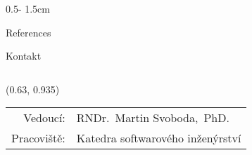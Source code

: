 \documentclass[a0paper]{uioposter}
\begin{document}
\begin{frame}
\begin{columns}[onlytextwidth]
\begin{column}{0.5\textwidth - 1.5cm}
    \begin{block}{References}
        \lipsum[6]
    \end{block}

    \begin{block}{Kontakt}
        \lipsum[75]
    \end{block}
\end{column}


\end{columns}


\begin{textblock}{0.5}(0.63, 0.935)
    \color{white}
    \sffamily
    \begin{tabular}{rl}
        Vedoucí:& RNDr.~Martin Svoboda,~PhD.
        \\
        Pracoviště:& Katedra softwarového inženýrství
    \end{tabular}
\end{textblock}


\end{frame}
\end{document}
